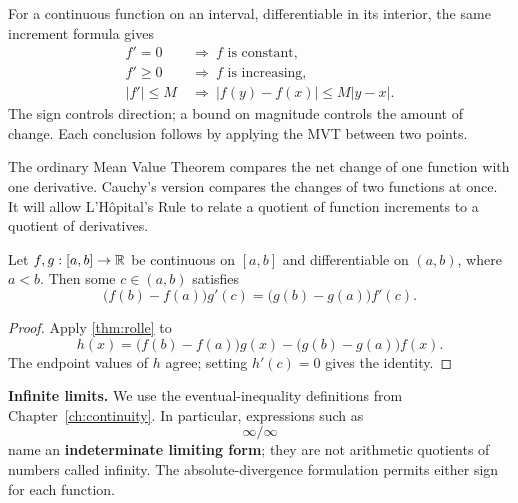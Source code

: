 \begin{remark}
For a continuous function on an interval, differentiable in its interior,
the same increment formula gives
\[
\begin{aligned}
f'=0&\ \Longrightarrow\ f\text{ is constant},\\
f'\geq0&\ \Longrightarrow\ f\text{ is increasing},\\
|f'|\leq M&\ \Longrightarrow\ |f(y)-f(x)|\leq M|y-x|.
\end{aligned}
\]
The sign controls direction; a bound on magnitude controls the amount of
change. Each conclusion follows by applying the MVT between two points.
\end{remark}

The ordinary Mean Value Theorem compares the net change of one function with
one derivative.  Cauchy's version compares the changes of two functions at
once. It will allow L'H\^opital's Rule to relate a quotient of function
increments to a quotient of derivatives.

\begin{theorem}
\label{thm:cauchy-mvt}
Let $f,g:[a,b]\to\mathbb{R}$ be continuous on $[a,b]$ and differentiable on $(a,b)$, where $a<b$. Then some $c\in(a,b)$ satisfies
\[
\bigl(f(b)-f(a)\bigr)g'(c)=\bigl(g(b)-g(a)\bigr)f'(c).
\]
\end{theorem}
\begin{proof}
Apply \cref{thm:rolle} to
\[
h(x)=\bigl(f(b)-f(a)\bigr)g(x)-\bigl(g(b)-g(a)\bigr)f(x).
\]
The endpoint values of $h$ agree; setting $h'(c)=0$ gives the identity.
\end{proof}

\noindent\textbf{Infinite limits.} We use the eventual-inequality
definitions from Chapter~\ref{ch:continuity}.  In particular, expressions
such as
\[
\infty/\infty
\]
 name an
\textbf{indeterminate limiting form}; they are not arithmetic quotients of
numbers called infinity. The absolute-divergence formulation permits either
sign for each function.

